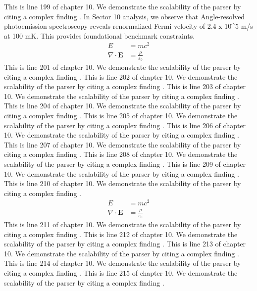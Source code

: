 This is line 199 of chapter 10. We demonstrate the scalability of the parser by citing a complex finding \cite{ref10_199}.
In Sector 10 analysis, we observe that Angle-resolved photoemission spectroscopy reveals renormalized Fermi velocity of 2.4 x 10^5 m/s at 100 mK. This provides foundational benchmark constraints.
\begin{align*}
  E &= mc^2 \\
  \nabla \cdot \mathbf{E} &= \frac{\rho}{\varepsilon_0}
\end{align*}
This is line 201 of chapter 10. We demonstrate the scalability of the parser by citing a complex finding \cite{ref10_201}.
This is line 202 of chapter 10. We demonstrate the scalability of the parser by citing a complex finding \cite{ref10_202}.
This is line 203 of chapter 10. We demonstrate the scalability of the parser by citing a complex finding \cite{ref10_203}.
This is line 204 of chapter 10. We demonstrate the scalability of the parser by citing a complex finding \cite{ref10_204}.
This is line 205 of chapter 10. We demonstrate the scalability of the parser by citing a complex finding \cite{ref10_205}.
This is line 206 of chapter 10. We demonstrate the scalability of the parser by citing a complex finding \cite{ref10_206}.
This is line 207 of chapter 10. We demonstrate the scalability of the parser by citing a complex finding \cite{ref10_207}.
This is line 208 of chapter 10. We demonstrate the scalability of the parser by citing a complex finding \cite{ref10_208}.
This is line 209 of chapter 10. We demonstrate the scalability of the parser by citing a complex finding \cite{ref10_209}.
This is line 210 of chapter 10. We demonstrate the scalability of the parser by citing a complex finding \cite{ref10_210}.
\begin{align*}
  E &= mc^2 \\
  \nabla \cdot \mathbf{E} &= \frac{\rho}{\varepsilon_0}
\end{align*}
This is line 211 of chapter 10. We demonstrate the scalability of the parser by citing a complex finding \cite{ref10_211}.
This is line 212 of chapter 10. We demonstrate the scalability of the parser by citing a complex finding \cite{ref10_212}.
This is line 213 of chapter 10. We demonstrate the scalability of the parser by citing a complex finding \cite{ref10_213}.
This is line 214 of chapter 10. We demonstrate the scalability of the parser by citing a complex finding \cite{ref10_214}.
This is line 215 of chapter 10. We demonstrate the scalability of the parser by citing a complex finding \cite{ref10_215}.
